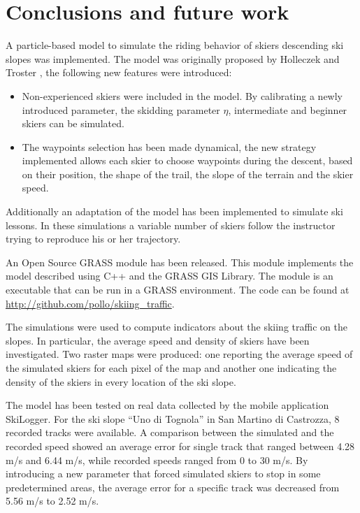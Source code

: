 \documentclass[12pt,a4paper,twoside]{book}
\begin{document}
\chapter{Conclusions and future work}\label{conclusions}
A particle-based model to simulate the riding behavior of skiers descending ski slopes was implemented. The model was originally proposed by Holleczek and Troster \cite{hol2012}, the following new features were introduced:
\begin{itemize}
\item Non-experienced skiers were included in the model. By calibrating a newly introduced parameter, the skidding parameter $\eta$, intermediate and beginner skiers can be simulated.
\item The waypoints selection has been made dynamical, the new strategy implemented allows each skier to choose waypoints during the descent, based on their position, the shape of the trail, the slope of the terrain and the skier speed.
\end{itemize}
Additionally an adaptation of the model has been implemented to simulate ski lessons. In these simulations a variable number of skiers follow the instructor trying to reproduce his or her trajectory.

An Open Source GRASS module has been released. This module implements the model described using C++ and the GRASS GIS Library. The module is an executable that can be run in a GRASS environment. The code can be found at \url{http://github.com/pollo/skiing_traffic}.

The simulations were used to compute indicators about the skiing traffic on the slopes. In particular, the average speed and density of skiers have been investigated. Two raster maps were produced: one reporting the average speed of the simulated skiers for each pixel of the map and another one indicating the density of the skiers in every location of the ski slope.

The model has been tested on real data collected by the mobile application SkiLogger. For the ski slope ``Uno di Tognola'' in San Martino di Castrozza, 8 recorded tracks were available. A comparison between the simulated and the recorded speed showed an average error for single track that ranged between 4.28 m/s and 6.44 m/s, while recorded speeds ranged from 0 to 30 m/s. By introducing a new parameter that forced simulated skiers to stop in some predetermined areas, the average error for a specific track was decreased from 5.56 m/s to 2.52 m/s.
\end{document}
